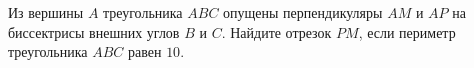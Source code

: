 \begin{ex}
	\begin{condition}
		Из вершины \( A  \) треугольника \( ABC  \) опущены перпендикуляры \( AM  \) и \( AP  \) на биссектрисы внешних углов \( B  \) и \( C \). Найдите отрезок \( PM \), если периметр треугольника \( ABC  \) равен \( 10 \).
	\end{condition}
\end{ex}
